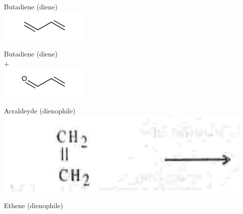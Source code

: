 \documentclass[10pt]{article}
\begin{document}
Butadiene (diene)\\
\includegraphics{smile-d1ba59f9e7b9fcbe09e269dcbfcb37c6cd5ce0b2}

Butadiene (diene)\\
$+$\\
\includegraphics{smile-670081d1e2e9cb9a2cdb1f802cfa9f58c924fe5b}

Acraldeyde (dienophile)\\
\includegraphics[max width=\textwidth, center]{2025_01_28_8470952b98110cec3aabg-196(3)}

Ethene (dienophile)
\end{document}
